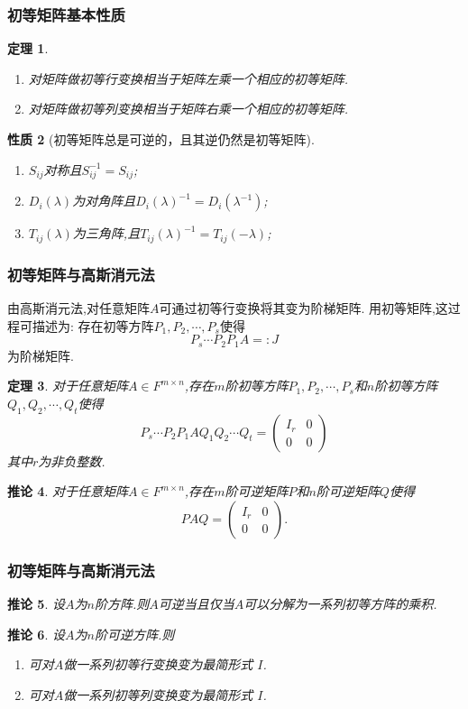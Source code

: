 \documentclass{article}
\newtheorem{theorem}{定理}  %
\newtheorem{proposition}[theorem]{性质}  %
\newtheorem{corollary}[theorem]{推论}
\renewcommand{\blue }[1]{{\textcolor[rgb]{0,0,1}{#1}}}
\begin{document}
\subsubsection{初等矩阵基本性质}
\begin{theorem}
\begin{enumerate}
\item 对矩阵做初等\blue{行}变换相当于矩阵\blue{左}乘一个相应的初等矩阵.
\item 对矩阵做初等\blue{列}变换相当于矩阵\blue{右}乘一个相应的初等矩阵.
\end{enumerate}
\end{theorem}
\begin{proposition}[初等矩阵总是可逆的，且其逆仍然是初等矩阵]
\begin{enumerate}
\item $S_{ij}$对称且$S_{ij}^{-1}=S_{ij}$;
\item $D_i(\lambda)$为对角阵且$D_i(\lambda)^{-1}=D_i(\lambda^{-1})$;
\item $T_{ij}(\lambda)$为三角阵,且$T_{ij}(\lambda)^{-1}=T_{ij}(-\lambda)$;
\end{enumerate}
\end{proposition}

\subsubsection{初等矩阵与高斯消元法}
由高斯消元法,对任意矩阵$A$可通过初等行变换将其变为阶梯矩阵.
用初等矩阵,这过程可描述为: 存在初等方阵$P_1,P_2,\cdots,P_s$使得
\[P_s\cdots P_2P_1A =: J\]
为阶梯矩阵.
\begin{theorem}对于任意矩阵$A\in F^{m\times n}$,存在$m$阶初等方阵$P_1,P_2,\cdots,P_s$和$n$阶初等方阵$Q_1,Q_2,\cdots,Q_t$使得
\[P_s\cdots P_2P_1AQ_1Q_2\cdots Q_t=\begin{pmatrix}I_r&0\\0&0\end{pmatrix}\]
其中$r$为非负整数.
\end{theorem}
\begin{corollary}对于任意矩阵$A\in F^{m\times n}$,存在$m$阶可逆矩阵$P$和$n$阶可逆矩阵$Q$使得
\[PAQ=\begin{pmatrix}I_r&0\\0&0\end{pmatrix}.\]
\end{corollary}

\subsubsection{初等矩阵与高斯消元法}
\begin{corollary}设$A$为$n$阶方阵.则$A$可逆当且仅当$A$可以分解为一系列初等方阵的乘积.
\end{corollary}
\begin{corollary}设$A$为$n$阶可逆方阵.则
\begin{enumerate}
\item 可对$A$做一系列初等行变换变为最简形式 $I$.
\item 可对$A$做一系列初等列变换变为最简形式 $I$.
\end{enumerate}
\end{corollary}
\end{document}
